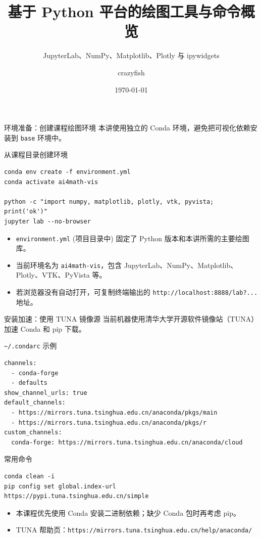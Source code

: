 \documentclass[aspectratio=169,11pt]{ctexbeamer}
\title{基于 Python 平台的绘图工具与命令概览}
\subtitle{JupyterLab、NumPy、Matplotlib、Plotly 与 ipywidgets}
\author{crazyfish}
\date{\today}
\begin{document}
\begin{frame}
  \titlepage
\end{frame}

\begin{frame}[fragile]{环境准备：创建课程绘图环境}
  本讲使用独立的 Conda 环境，避免把可视化依赖安装到 \texttt{base} 环境中。

  \begin{block}{从课程目录创建环境}
\begin{Verbatim}[fontsize=\small]
conda env create -f environment.yml
conda activate ai4math-vis

python -c "import numpy, matplotlib, plotly, vtk, pyvista; print('ok')"
jupyter lab --no-browser
\end{Verbatim}
  \end{block}

  \begin{itemize}
    \item \texttt{environment.yml} (项目目录中) 固定了 Python 版本和本讲所需的主要绘图库。
    \item 当前环境名为 \texttt{ai4math-vis}，包含 JupyterLab、NumPy、Matplotlib、Plotly、VTK、PyVista 等。
    \item 若浏览器没有自动打开，可复制终端输出的 \texttt{http://localhost:8888/lab?...} 地址。
  \end{itemize}
\end{frame}

\begin{frame}[fragile]{安装加速：使用 TUNA 镜像源}
  当前机器使用清华大学开源软件镜像站（TUNA）加速 Conda 和 pip 下载。

  \begin{block}{\texttt{\textasciitilde/.condarc} 示例}
\begin{Verbatim}[fontsize=\tiny]
channels:
  - conda-forge
  - defaults
show_channel_urls: true
default_channels:
  - https://mirrors.tuna.tsinghua.edu.cn/anaconda/pkgs/main
  - https://mirrors.tuna.tsinghua.edu.cn/anaconda/pkgs/r
custom_channels:
  conda-forge: https://mirrors.tuna.tsinghua.edu.cn/anaconda/cloud
\end{Verbatim}
  \end{block}

  \begin{block}{常用命令}
\begin{Verbatim}[fontsize=\small]
conda clean -i
pip config set global.index-url https://pypi.tuna.tsinghua.edu.cn/simple
\end{Verbatim}
  \end{block}

  \begin{itemize}
    \item 本课程优先使用 Conda 安装二进制依赖；缺少 Conda 包时再考虑 pip。
    \item TUNA 帮助页：\texttt{https://mirrors.tuna.tsinghua.edu.cn/help/anaconda/}
  \end{itemize}
\end{frame}
\end{document}
